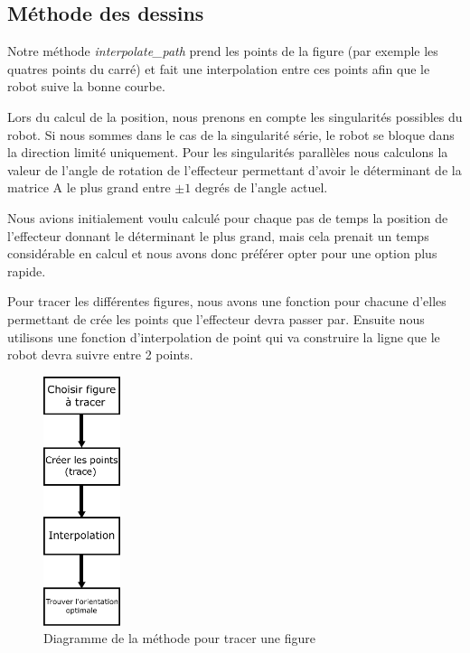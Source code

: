 \documentclass[a4paper, 11pt]{report}
\begin{document}
\subsection{Méthode des dessins}

Notre méthode \textit{interpolate\_path} prend les points de la figure (par exemple les quatres points du carré) et fait une interpolation entre ces points afin que le robot suive la bonne courbe.

Lors du calcul de la position, nous prenons en compte les singularités possibles du robot. Si nous sommes dans le cas de la singularité série, le robot se bloque dans la direction limité uniquement. Pour les singularités parallèles nous calculons la valeur de l'angle de rotation de l'effecteur permettant d'avoir le déterminant de la matrice A le plus grand entre $\pm1$ degrés de l'angle actuel.

Nous avions initialement voulu calculé pour chaque pas de temps la position de l'effecteur donnant le déterminant le plus grand, mais cela prenait un temps considérable en calcul et nous avons donc préférer opter pour une option plus rapide.


Pour tracer les différentes figures, nous avons une fonction pour chacune d'elles permettant de crée les points que l'effecteur devra passer par. Ensuite nous utilisons une fonction d'interpolation de point qui va construire la ligne que le robot devra suivre entre 2 points.
\begin{figure}[!htb]
    \centering
    \includegraphics[width=0.2\textwidth]{Figures/diag_trace_method.pdf}
    \caption{Diagramme de la méthode pour tracer une figure}
    \label{fig:diag_tracemethode}
\end{figure}
\end{document}
